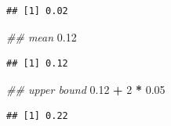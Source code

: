 \documentclass[12pt,]{krantz}
\newenvironment{Shaded}{\begin{snugshade}}{\end{snugshade}}
\newcommand{\CommentTok}[1]{\textcolor[rgb]{0.56,0.35,0.01}{\textit{#1}}}
\newcommand{\DecValTok}[1]{\textcolor[rgb]{0.00,0.00,0.81}{#1}}
\newcommand{\FloatTok}[1]{\textcolor[rgb]{0.00,0.00,0.81}{#1}}
\newcommand{\OperatorTok}[1]{\textcolor[rgb]{0.81,0.36,0.00}{\textbf{#1}}}
\newcommand{\StringTok}[1]{\textcolor[rgb]{0.31,0.60,0.02}{#1}}
\begin{document}
\begin{verbatim}
## [1] 0.02
\end{verbatim}

\begin{Shaded}
\begin{Highlighting}[]
\CommentTok{## mean}
\FloatTok{0.12}
\end{Highlighting}
\end{Shaded}

\begin{verbatim}
## [1] 0.12
\end{verbatim}

\begin{Shaded}
\begin{Highlighting}[]
\CommentTok{## upper bound}
\FloatTok{0.12} \OperatorTok{+}\StringTok{ }\DecValTok{2} \OperatorTok{*}\StringTok{ }\FloatTok{0.05}
\end{Highlighting}
\end{Shaded}

\begin{verbatim}
## [1] 0.22
\end{verbatim}
\end{document}
